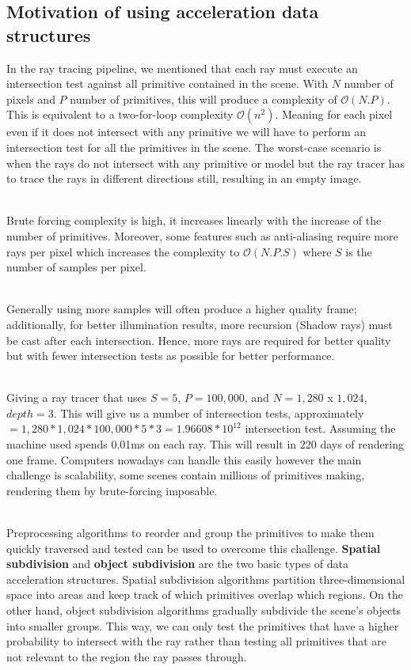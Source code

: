 \documentclass[11pt,a4paper]{article}
\begin{document}
\subsection{Motivation of using acceleration data structures}
In the ray tracing pipeline, we mentioned that each ray must execute an intersection test against all primitive contained in the scene. With $N$ number of pixels and $P$ number of primitives, this will produce a complexity of $\mathcal{O}(N.P)$. This is equivalent to a two-for-loop complexity $\mathcal{O}(n^2)$. Meaning for each pixel even if it does not intersect with any primitive we will have to perform an intersection test for all the primitives in the scene. The worst-case scenario is when the rays do not intersect with any primitive or model but the ray tracer has to trace the rays in different directions still, resulting in an empty image. 

\noindent
\\
Brute forcing complexity is high, it increases linearly with the increase of the number of primitives. Moreover, some features such as anti-aliasing require more rays per pixel which increases the complexity to  $\mathcal{O}(N.P.S)$ where $S$ is the number of samples per pixel. 

\noindent
\\
Generally using more samples will often produce a higher quality frame; additionally, for better illumination results, more recursion (Shadow rays) must be cast after each intersection. Hence, more rays are required for better quality but with fewer intersection tests as possible for better performance.

\noindent
\\
Giving a ray tracer that uses $S = 5$, $P = 100, 000$, and $N =  1, 280 $ x $1, 024$, $depth = 3$. This will give us a number of intersection tests, approximately $= 1, 280 * 1, 024 * 100, 000 * 5 * 3 = 1.96608*10^{12} $ intersection test. Assuming the machine used spends 0.01ms on each ray. This will result in 220 days of rendering one frame. Computers nowadays can handle this easily however the main challenge is scalability, some scenes contain millions of primitives making, rendering them by brute-forcing imposable.

\noindent
\\ 
Preprocessing algorithms to reorder and group the primitives to make them quickly traversed and tested can be used to overcome this challenge. \textbf{Spatial subdivision} and \textbf{object subdivision} are the two basic types of data acceleration structures. Spatial subdivision algorithms partition three-dimensional space into areas and keep track of which primitives overlap which regions. On the other hand, object subdivision algorithms gradually subdivide the scene's objects into smaller groups. This way, we can only test the primitives that have a higher probability to intersect with the ray rather than testing all primitives that are not relevant to the region the ray passes through. 
\end{document}
